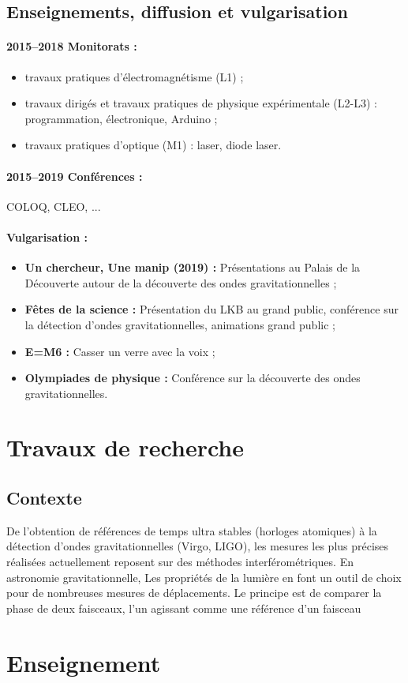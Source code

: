 \documentclass[12pt,a4paper]{article}
\begin{document}
\subsection{Enseignements, diffusion et vulgarisation}

\paragraph{2015--2018 Monitorats :}
\begin{itemize}
\item travaux pratiques d'électromagnétisme (L1) ;
\item travaux dirigés et travaux pratiques de physique expérimentale (L2-L3) : programmation, électronique, Arduino ;
\item travaux pratiques d'optique (M1) : laser, diode laser.
\end{itemize}

\paragraph{2015--2019 Conférences :} COLOQ, CLEO, ... 

\paragraph{Vulgarisation :}
\begin{itemize}
\item \textbf{Un chercheur, Une manip (2019) :} Présentations au Palais de la Découverte autour de la découverte des ondes gravitationnelles ;
\item \textbf{Fêtes de la science :} Présentation du LKB au grand public, conférence sur la détection d'ondes gravitationnelles, animations grand public ;
\item \textbf{E=M6 :} Casser un verre avec la voix ;
\item \textbf{Olympiades de physique :} Conférence sur la découverte des ondes gravitationnelles.
\end{itemize}

\section{Travaux de recherche}

\subsection{Contexte}

De l'obtention de références de temps ultra stables (horloges atomiques) à la détection d'ondes gravitationnelles (Virgo, LIGO), les mesures les plus précises réalisées actuellement reposent sur des méthodes interférométriques.
En astronomie gravitationnelle, 
Les propriétés de la lumière en font un outil de choix pour de nombreuses mesures de déplacements.
Le principe est de comparer la phase de deux faisceaux, l'un agissant comme une référence  d'un faisceau



\section{Enseignement}
\end{document}
